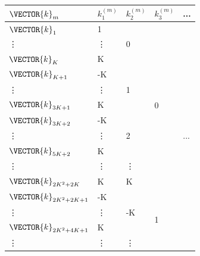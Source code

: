 \hfill
\begin{minipage}{0.45\textwidth}
\begin{table}[H]
\centering
\begin{tabular}{|l||l|l|l|l|}
\hline
$\VECTOR{k}_m$     &$k_1^{(m)}$& $k_2^{(m)}$      & $k_3^{(m)}$         & ...                   \\ \hline \hline
$\VECTOR{k}_{1}$   & 1      & \multirow{3}{*}{0}  & \multirow{11}{*}{0} & \multirow{20}{*}{...} \\ \cline{1-2}
\vdots             & \vdots &                     &                     &                       \\ \cline{1-2}
$\VECTOR{k}_{K}$   & K      &                     &                     &                       \\ \cline{1-3}
$\VECTOR{k}_{K+1}$ & -K     & \multirow{3}{*}{1}  &                     &                       \\ \cline{1-2}
\vdots             & \vdots &                     &                     &                       \\ \cline{1-2}
$\VECTOR{k}_{3K+1}$& K      &                     &                     &                       \\ \cline{1-3}
$\VECTOR{k}_{3K+2}$& -K     & \multirow{3}{*}{2}  &                     &                       \\ \cline{1-2}
\vdots             & \vdots &                     &                     &                       \\ \cline{1-2}
$\VECTOR{k}_{5K+2}$& K      &                     &                     &                       \\ \cline{1-3}
\vdots             & \vdots & \vdots              &                     &                       \\ \cline{1-3}
$\VECTOR{k}_{2K^2+2K}$  & K & K                   &                     &                       \\ \cline{1-4}
$\VECTOR{k}_{2K^2+2K+1}$& -K& \multirow{3}{*}{-K} & \multirow{7}{*}{1}  &                       \\ \cline{1-2}
\vdots             & \vdots &                     &                     &                       \\ \cline{1-2}
$\VECTOR{k}_{2K^2+4K+1}$& K &                     &                     &                       \\ \cline{1-3}
\vdots             & \vdots & \vdots              &                     &                       \\ \cline{1-3}

\end{tabular}
\end{table}
\end{minipage}
